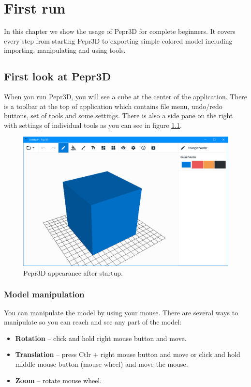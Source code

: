 \chapter{First run}

In this chapter we show the usage of Pepr3D for complete beginners. It covers every step from starting Pepr3D to exporting simple colored model including importing, manipulating and using tools.


\section{First look at Pepr3D}

When you run Pepr3D, you will see a cube at the center of the application. There is a toolbar at the top of application which contains file menu, undo/redo buttons, set of tools and some settings. There is also a side pane on the right with settings of individual tools as you can see in figure \ref{fig:pepr_cube}.

\begin{figure}
	\centering
	\includegraphics[scale=0.5]{images/pepr_cube.png}
	\caption{Pepr3D appearance after startup.}
	\label{fig:pepr_cube}
\end{figure}

\subsection{Model manipulation}
You can manipulate the model by using your mouse. There are several ways to manipulate so you can reach and see any part of the model:

\begin{itemize}
\item \textbf{Rotation} -- click and hold right mouse button and move.
\item \textbf{Translation} -- press Ctlr + right mouse button and move or click and hold middle mouse button (mouse wheel) and move the mouse.
\item \textbf{Zoom} -- rotate mouse wheel.
\end{itemize}

